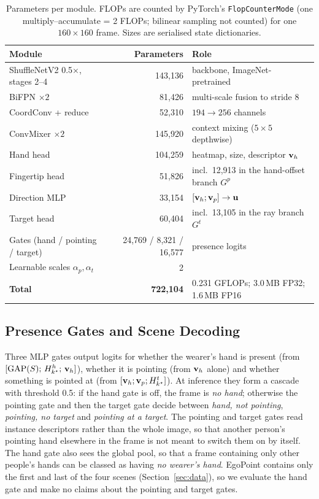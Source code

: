 \begin{table}[t]
  \caption{Parameters per module. FLOPs are counted by PyTorch's \texttt{FlopCounterMode} (one multiply--accumulate = 2 FLOPs; bilinear sampling not counted) for one $160\times160$ frame. Sizes are serialised state dictionaries.}
  \label{tab:params}
  \small
  \begin{tabular}{lrl}
    \toprule
    Module & Parameters & Role \\
    \midrule
    ShuffleNetV2 0.5$\times$, stages 2--4 & 143,136 & backbone, ImageNet-pretrained \\
    BiFPN $\times2$ & 81,426 & multi-scale fusion to stride 8 \\
    CoordConv + reduce & 52,310 & $194\to256$ channels \\
    ConvMixer $\times2$ & 145,920 & context mixing ($5\times5$ depthwise) \\
    \midrule
    Hand head & 104,259 & heatmap, size, descriptor $\mathbf{v}_h$ \\
    Fingertip head & 51,826 & incl.\ 12,913 in the hand-offset branch $G^p$ \\
    Direction MLP & 33,154 & $[\mathbf{v}_h;\mathbf{v}_p]\to\mathbf{u}$ \\
    Target head & 60,404 & incl.\ 13,105 in the ray branch $G^t$ \\
    Gates (hand / pointing / target) & 24,769 / 8,321 / 16,577 & presence logits \\
    Learnable scales $\alpha_p,\alpha_t$ & 2 & \\
    \midrule
    \textbf{Total} & \textbf{722,104} & 0.231 GFLOPs; 3.0\,MB FP32; 1.6\,MB FP16 \\
    \bottomrule
  \end{tabular}
\end{table}

\subsection{Presence Gates and Scene Decoding}\label{sec:gates}
Three MLP gates output logits for whether the wearer's hand is present (from $[\mathrm{GAP}(S);\,H^h_{k^\star};\,\mathbf{v}_h]$), whether it is pointing (from $\mathbf{v}_h$ alone) and whether something is pointed at (from $[\mathbf{v}_h;\mathbf{v}_p;H^t_{k^\star}]$). At inference they form a cascade with threshold 0.5: if the hand gate is off, the frame is \emph{no hand}; otherwise the pointing gate and then the target gate decide between \emph{hand, not pointing}, \emph{pointing, no target} and \emph{pointing at a target}. The pointing and target gates read instance descriptors rather than the whole image, so that another person's pointing hand elsewhere in the frame is not meant to switch them on by itself. The hand gate also sees the global pool, so that a frame containing only other people's hands can be classed as having \emph{no wearer's hand}. EgoPoint contains only the first and last of the four scenes (Section~\ref{sec:data}), so we evaluate the hand gate and make no claims about the pointing and target gates.

